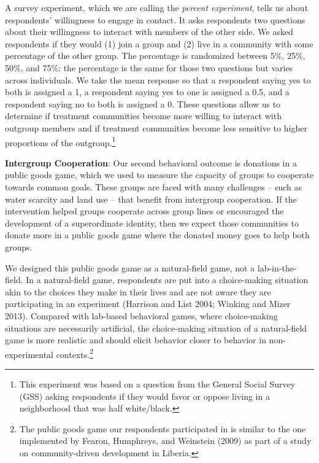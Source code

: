 \documentclass[11pt]{article}
\begin{document}
A survey experiment, which we are calling the \emph{percent experiment},
tells us about respondents' willingness to engage in contact. It asks
respondents two questions about their willingness to interact with
members of the other side. We asked respondents if they would (1) join a
group and (2) live in a community with some percentage of the other
group. The percentage is randomized between 5\%, 25\%, 50\%, and 75\%;
the percentage is the same for those two questions but varies across
individuals. We take the mean response so that a respondent saying yes
to both is assigned a 1, a respondent saying yes to one is assigned a
0.5, and a respondent saying no to both is assigned a 0. These questions
allow us to determine if treatment communities become more willing to
interact with outgroup members and if treatment communities become less
sensitive to higher proportions of the outgroup.\footnote{This
  experiment was based on a question from the General Social Survey
  (GSS) asking respondents if they would favor or oppose living in a
  neighborhood that was half white/black.}

\textbf{Intergroup Cooperation}: Our second behavioral outcome is
donations in a public goods game, which we used to measure the capacity
of groups to cooperate towards common goals. These groups are faced with
many challenges -- such as water scarcity and land use -- that benefit
from intergroup cooperation. If the intervention helped groups cooperate
across group lines or encouraged the development of a superordinate
identity, then we expect those communities to donate more in a public
goods game where the donated money goes to help both groups.

We designed this public goods game as a natural-field game, not a
lab-in-the-field. In a natural-field game, respondents are put into a
choice-making situation akin to the choices they make in their lives and
are not aware they are participating in an experiment (Harrison and List
2004; Winking and Mizer 2013). Compared with lab-based behavioral games,
where choice-making situations are necessarily artificial, the
choice-making situation of a natural-field game is more realistic and
should elicit behavior closer to behavior in non-experimental
contexts.\footnote{The public goods game our respondents participated in
  is similar to the one implemented by Fearon, Humphreys, and Weinstein
  (2009) as part of a study on community-driven development in Liberia.}
\end{document}
